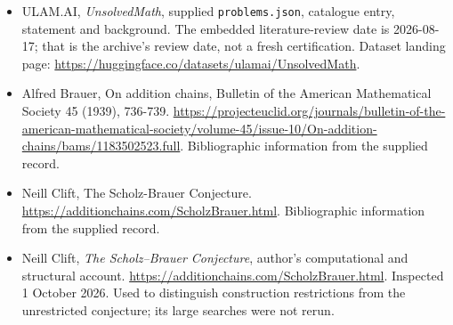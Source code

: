 \documentclass[11pt,a4paper]{article}
\begin{document}
{\small

\begin{itemize}

\item[\hypertarget{source:statement:1}{S1}] ULAM.AI, \emph{UnsolvedMath}, supplied \texttt{problems.json}, catalogue entry, statement and background. The embedded literature-review date is 2026-08-17; that is the archive’s review date, not a fresh certification. Dataset landing page: \url{https://huggingface.co/datasets/ulamai/UnsolvedMath}.

\item[\hypertarget{source:statement:2}{S2}] Alfred Brauer, On addition chains, Bulletin of the American Mathematical Society 45 (1939), 736-739. \url{https://projecteuclid.org/journals/bulletin-of-the-american-mathematical-society/volume-45/issue-10/On-addition-chains/bams/1183502523.full}. Bibliographic information from the supplied record.

\item[\hypertarget{source:statement:3}{S3}] Neill Clift, The Scholz-Brauer Conjecture. \url{https://additionchains.com/ScholzBrauer.html}. Bibliographic information from the supplied record.


\item[E1] Neill Clift, \emph{The Scholz--Brauer Conjecture},
author's computational and structural account.
\url{https://additionchains.com/ScholzBrauer.html}.
Inspected 1 October 2026. Used to distinguish construction restrictions
from the unrestricted conjecture; its large searches were not rerun.

\end{itemize}

}

\label{end:statement}
\end{document}
